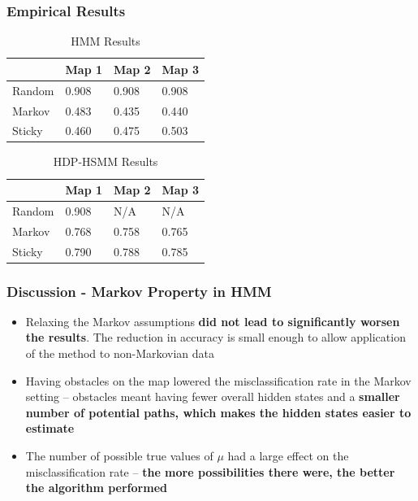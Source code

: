 \documentclass{beamer}
\begin{document}
\begin{frame}
    \frametitle{Empirical Results}
    \begin{table}[H]
    	\centering
    	\begin{tabular}{|l|l|l|l|}
    		\hline
    		& Map 1 & Map 2 & Map 3 \\
    		\hline
    		Random	& 0.908 & 0.908 & 0.908  \\
    		\hline
    		Markov & 0.483 & 0.435 & 0.440 \\
    		\hline
    		Sticky & 0.460 & 0.475& 0.503 \\
    		\hline
    	\end{tabular}
    	\caption{HMM Results}
    \end{table}

    \begin{table}[H]
    	\centering
    	\begin{tabular}{|l|l|l|l|}
    		\hline
    		& Map 1 & Map 2 & Map 3 \\
    		\hline
    		Random	& 0.908 & N/A  & N/A   \\
    		\hline
    		Markov & 0.768 & 0.758 & 0.765 \\
    		\hline
    		Sticky & 0.790 & 0.788 & 0.785  \\
    		\hline
    	\end{tabular}
    	\caption{HDP-HSMM Results}
    \end{table}
\end{frame}

\begin{frame}
	\frametitle{Discussion - Markov Property in HMM}
	\begin{itemize}
		\item Relaxing the Markov assumptions \textbf{did not lead to significantly worsen the results}. The reduction in accuracy is small enough to allow application of the method to non-Markovian data 
		\item Having obstacles on the map lowered the misclassification rate in the Markov setting -- obstacles meant having fewer overall hidden states and a \textbf{smaller number of potential paths, which makes the hidden states easier to estimate}
		\item The number of possible true values of $\mu$ had a large effect on the misclassification rate -- \textbf{the more possibilities there were, the better the algorithm performed}
	\end{itemize}
\end{frame}
\end{document}
